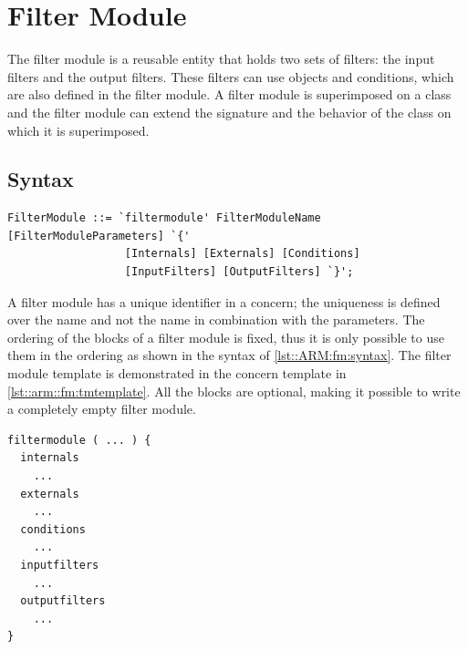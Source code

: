 \chapter{Filter Module} \label{chapter:filtermodule}
The filter module is a reusable entity that holds two sets of filters: the input filters and the output filters. These filters can use objects and conditions, which are also defined in the filter module. 
A filter module is superimposed on a class and the filter module can extend the signature and the behavior of the class on which it is superimposed.

\section*{Syntax}
\begin{lstlisting}[caption = {Filter module syntax}, label = lst::ARM:fm:syntax,
style = listing, language = ebnf, float = tpb]
FilterModule ::= `filtermodule' FilterModuleName [FilterModuleParameters] `{'
                  [Internals] [Externals] [Conditions]
                  [InputFilters] [OutputFilters] `}';
\end{lstlisting}
A filter module has a unique identifier in a concern; the uniqueness is defined over the name and not the name
in combination with the parameters.
The  ordering of the blocks
of a filter module
is fixed, thus it is only possible to use them in the ordering as shown in the syntax of \autoref{lst::ARM:fm:syntax}. The filter module template is demonstrated in
the concern template in \autoref{lst::arm::fm:tmtemplate}.
All the blocks are optional, making it possible to write a completely empty filter module.
\begin{lstlisting}[language={Composestar},style=floatlisting, caption={Filter module template},label={lst::arm::fm:tmtemplate}, floatplacement=tbp]
filtermodule ( ... ) {
  internals
    ...
  externals
    ...
  conditions
    ...
  inputfilters
    ...
  outputfilters
    ...
}
\end{lstlisting}

